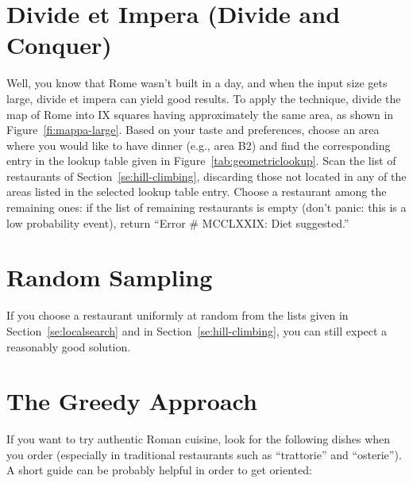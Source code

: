 \documentclass[twocolumn,10pt]{article}
\begin{document}
\section{Divide et Impera (Divide and Conquer)}
\label{se:divideetimpera}

\vspace{-2mm}

Well, you know that Rome wasn't built in a day, and when the input 
size gets large, divide et impera can yield good results.
To apply the technique, divide the map of Rome into IX squares having 
approximately the same area, as shown in Figure~\ref{fi:mappa-large}. 
Based on your taste and preferences, choose an area where you would 
like to have dinner (e.g., area B2) and find the corresponding entry 
in the lookup table given in Figure~\ref{tab:geometriclookup}. Scan 
the list of restaurants of Section~\ref{se:hill-climbing}, discarding 
those not located in any of the areas listed in the selected lookup 
table entry. Choose a restaurant among the remaining ones: if the 
list of remaining restaurants is empty (don't panic: this is a low 
probability event), return ``Error \# MCCLXXIX: Diet suggested.''


\section{Random Sampling}
\label{se:sampling}

\vspace{-2mm}



If you choose a restaurant uniformly at random from the lists given 
in Section~\ref{se:localsearch} and in 
Section~\ref{se:hill-climbing}, you can still expect a reasonably 
good solution.


\section{The Greedy Approach}
\label{se:heuristic}

\vspace{-2mm}

If you want to try authentic Roman cuisine, look for the following 
dishes when you order (especially in traditional restaurants such as 
``trattorie'' and ``osterie''). A short guide can be probably helpful 
in order to get oriented:
\end{document}
